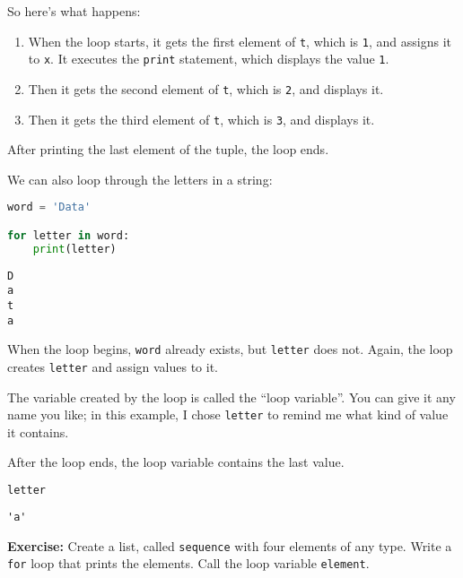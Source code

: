 So here's what happens:

\begin{enumerate}
\def\labelenumi{\arabic{enumi}.}
\item
  When the loop starts, it gets the first element of
  \passthrough{\lstinline!t!}, which is \passthrough{\lstinline!1!}, and
  assigns it to \passthrough{\lstinline!x!}. It executes the
  \passthrough{\lstinline!print!} statement, which displays the value
  \passthrough{\lstinline!1!}.
\item
  Then it gets the second element of \passthrough{\lstinline!t!}, which
  is \passthrough{\lstinline!2!}, and displays it.
\item
  Then it gets the third element of \passthrough{\lstinline!t!}, which
  is \passthrough{\lstinline!3!}, and displays it.
\end{enumerate}

After printing the last element of the tuple, the loop ends.

We can also loop through the letters in a string:

\begin{lstlisting}[language=Python,style=source]
word = 'Data'

for letter in word:
    print(letter)
\end{lstlisting}

\begin{lstlisting}[style=output]
D
a
t
a
\end{lstlisting}

When the loop begins, \passthrough{\lstinline!word!} already exists, but
\passthrough{\lstinline!letter!} does not. Again, the loop creates
\passthrough{\lstinline!letter!} and assign values to it.

The variable created by the loop is called the ``loop variable''. You
can give it any name you like; in this example, I chose
\passthrough{\lstinline!letter!} to remind me what kind of value it
contains.

After the loop ends, the loop variable contains the last value.

\begin{lstlisting}[language=Python,style=source]
letter
\end{lstlisting}

\begin{lstlisting}[style=output]
'a'
\end{lstlisting}

\textbf{Exercise:} Create a list, called
\passthrough{\lstinline!sequence!} with four elements of any type. Write
a \passthrough{\lstinline!for!} loop that prints the elements. Call the
loop variable \passthrough{\lstinline!element!}.

